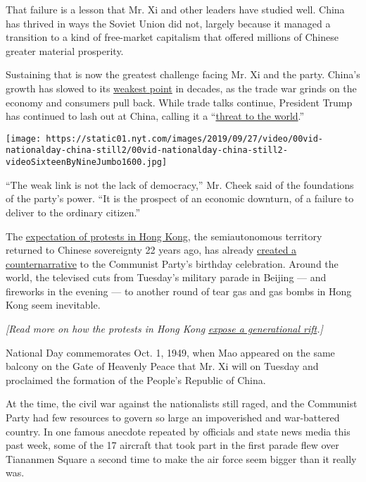That failure is a lesson that Mr. Xi and other leaders have studied
well. China has thrived in ways the Soviet Union did not, largely
because it managed a transition to a kind of free-market capitalism that
offered millions of Chinese greater material prosperity.

Sustaining that is now the greatest challenge facing Mr. Xi and the
party. China's growth has slowed to its
\href{https://www.nytimes.com/2019/07/14/business/china-economy-growth-gdp-trade-war.html}{weakest
point} in decades, as the trade war grinds on the economy and consumers
pull back. While trade talks continue, President Trump has continued to
lash out at China, calling it a
``\href{https://www.nytimes.com/2019/09/20/us/politics/trump-china-theat-to-world.html}{threat
to the world}.''

\texttt{[image: https://static01.nyt.com/images/2019/09/27/video/00vid-nationalday-china-still2/00vid-nationalday-china-still2-videoSixteenByNineJumbo1600.jpg]}

``The weak link is not the lack of democracy,'' Mr. Cheek said of the
foundations of the party's power. ``It is the prospect of an economic
downturn, of a failure to deliver to the ordinary citizen.''

The
\href{https://www.nytimes.com/2019/09/28/world/asia/hong-kong-protest.html}{expectation
of protests in Hong Kong}, the semiautonomous territory returned to
Chinese sovereignty 22 years ago, has already
\href{https://www.nytimes.com/2019/09/29/business/hong-kong-china-power.html}{created
a counternarrative} to the Communist Party's birthday celebration.
Around the world, the televised cuts from Tuesday's military parade in
Beijing --- and fireworks in the evening --- to another round of tear
gas and gas bombs in Hong Kong seem inevitable.

\emph{{[}Read more on how the protests in Hong Kong}
\emph{\href{https://www.nytimes.com/2019/09/28/world/asia/hong-kong-protests-china.html?action=click\&module=inline\&pgtype=Article}{expose
a generational rift}.{]}}

National Day commemorates Oct. 1, 1949, when Mao appeared on the same
balcony on the Gate of Heavenly Peace that Mr. Xi will on Tuesday and
proclaimed the formation of the People's Republic of China.

At the time, the civil war against the nationalists still raged, and the
Communist Party had few resources to govern so large an impoverished and
war-battered country. In one famous anecdote repeated by officials and
state news media this past week, some of the 17 aircraft that took part
in the first parade flew over Tiananmen Square a second time to make the
air force seem bigger than it really was.

